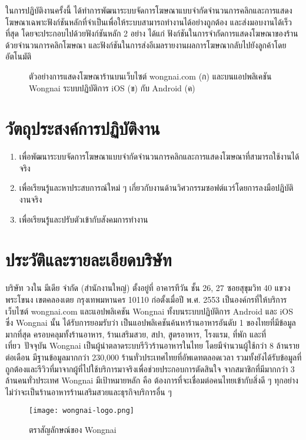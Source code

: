 ในการปฏิบัติงานครั้งนี้ ได้ทำการพัฒนาระบบจัดการโฆษณาแบบจำกัดจำนวนการคลิกและการแสดงโฆษณาเฉพาะฟังก์ชันหลักที่จำเป็นเพื่อให้ระบบสามารถทำงานได้อย่างถูกต้อง และส่งมอบงานได้เร็วที่สุด โดยจะประกอบไปด้วยฟังก์ชันหลัก 2 อย่าง ได้แก่ ฟังก์ชันในการจำกัดการแสดงโฆษณาของร้านด้วยจำนวนการคลิกโฆษณา และฟังก์ชันในการส่งอีเมลรายงานผลการโฆษณากลับไปยังลูกค้าโดยอัตโนมัติ

\begin{figure}[!p]
	\centering
	\caption{ตัวอย่างการแสดงโฆษณาร้านบนเว็บไซต์ wongnai.com (ก) และบนแอปพลิเคชัน Wongnai ระบบปฏิบัติการ iOS (ข) กับ Android (ค)}
	\label{Fig:listingad}
\end{figure}

\section{วัตถุประสงค์การปฏิบัติงาน}
\begin{enumerate}[noitemsep]
	\item เพื่อพัฒนาระบบจัดการโฆษณาแบบจำกัดจำนวนการคลิกและการแสดงโฆษณาที่สามารถใช้งานได้จริง
	\item เพื่อเรียนรู้และหาประสบการณ์ใหม่ ๆ เกี่ยวกับงานด้านวิศวกรรมซอฟต์แวร์โดยการลงมือปฏิบัติงานจริง
	\item เพื่อเรียนรู้และปรับตัวเข้ากับสังคมการทำงาน
\end{enumerate}

\section{ประวัติและรายละเอียดบริษัท}
บริษัท วงใน มีเดีย จำกัด (สำนักงานใหญ่) ตั้งอยู่ที่ อาคารทีวัน ชั้น 26, 27 ซอยสุขุมวิท 40 แขวงพระโขนง เขตคลองเตย กรุงเทพมหานคร 10110 ก่อตั้งเมื่อปี พ.ศ. 2553 เป็นองค์กรที่ให้บริการเว็บไซต์ wongnai.com และแอปพลิเคชัน Wongnai ทั้งบนระบบปฏิบัติการ Android และ iOS ซึ่ง Wongnai นั้น ได้รับการยอมรับว่า เป็นแอปพลิเคชันค้นหาร้านอาหารอันดับ 1 ของไทยที่มีข้อมูลมากที่สุด ครอบคลุมทั้งร้านอาหาร, ร้านเสริมสวย, สปา, สูตรอาหาร, โรงแรม, ที่พัก และที่เที่ยว ปัจจุบัน Wongnai เป็นผู้นำตลาดระบบรีวิวร้านอาหารในไทย โดยมีจำนวนผู้ใช้กว่า 8 ล้านรายต่อเดือน มีฐานข้อมูลมากกว่า 230,000 ร้านทั่วประเทศไทยที่อัพเดทตลอดเวลา รวมทั้งยังได้รับข้อมูลที่ถูกต้องและรีวิวที่มาจากผู้ที่ไปใช้บริการมาจริงเพื่อช่วยประกอบการตัดสินใจ จากสมาชิกที่มีมากกว่า 3 ล้านคนทั่วประเทศ Wongnai มีเป้าหมายหลัก คือ ต้องการที่จะเชื่อมต่อคนไทยเข้ากับสิ่งดี ๆ ทุกอย่างไม่ว่าจะเป็นร้านอาหารร้านเสริมสวยและธุรกิจบริการอื่น ๆ

\begin{figure}[!h]
	\centering
	\texttt{[image: wongnai-logo.png]}  
	\caption{ตราสัญลักษณ์ของ Wongnai}
	\label{Fig:wongnai-logo}
\end{figure}